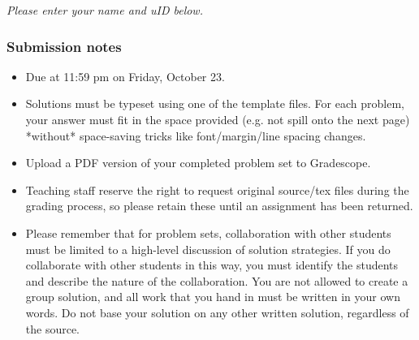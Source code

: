 \documentclass{article}
\begin{document}
{\it Please enter your name and uID below.}

\vspace{3em}

\par
{}
\par

\vfill

\subsubsection*{Submission notes}
\begin{itemize}
  \item Due at 11:59 pm on Friday, October 23.
  \item Solutions must be typeset using one of the template files. For each problem, your answer must fit
    in the space provided (e.g. not spill onto the next page) *without* space-saving tricks
    like font/margin/line spacing changes.
  \item Upload a PDF version of your completed problem set to Gradescope.
  \item Teaching staff reserve the right to request original source/tex files during the grading process, so please retain these until an assignment has been returned.
  \item Please remember that for problem sets, collaboration with other students must be limited to a high-level discussion of solution strategies. If you do collaborate with other students in this way, you must identify the students and describe the nature of the collaboration. You are not allowed to create a group solution, and all work that you hand in must be written in your own words. Do not base your solution on any other written solution, regardless of the source.
\end{itemize}

\pagebreak
\end{document}
